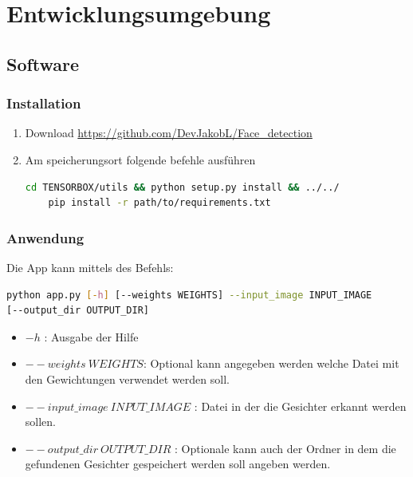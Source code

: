 \chapter{Entwicklungsumgebung}%
\section{Software}
\subsection{Installation}
\begin{enumerate}
\item Download  \url{https://github.com/DevJakobL/Face_detection}
\item Am speicherungsort folgende befehle ausführen
\begin{lstlisting}[language=bash]
	cd TENSORBOX/utils && python setup.py install && ../../
	pip install -r path/to/requirements.txt
\end{lstlisting}
\end{enumerate}
\subsection{Anwendung}
Die App kann mittels des Befehls: 
\begin{lstlisting}[language=bash]  
python app.py [-h] [--weights WEIGHTS] --input_image INPUT_IMAGE   
[--output_dir OUTPUT_DIR]
\end{lstlisting}
\begin{itemize}
\item$-h$ : Ausgabe der Hilfe
\item$--weights~WEIGHTS $: Optional kann angegeben werden welche Datei mit den Gewichtungen verwendet werden soll.
\item$--input\_image~INPUT\_IMAGE$ : Datei in der die Gesichter erkannt werden sollen.
\item$--output\_dir~OUTPUT\_DIR$ : Optionale kann auch der Ordner in dem die gefundenen Gesichter gespeichert werden soll angeben werden.
\end{itemize}
